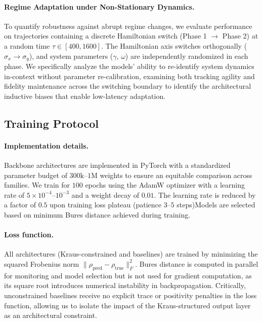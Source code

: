 \documentclass{article} %
\begin{document}
\paragraph{Regime Adaptation under Non-Stationary Dynamics.}
To quantify robustness against abrupt regime changes, we evaluate performance on trajectories containing a discrete Hamiltonian switch (Phase 1 $\to$ Phase 2) at a random time $\tau \in [400, 1600]$. The Hamiltonian axis switches orthogonally ($\sigma_x \to \sigma_y$), and system parameters ($\gamma$, $\omega$) are independently randomized in each phase. We specifically analyze the models' ability to re-identify system dynamics in-context without parameter re-calibration, examining both tracking agility and fidelity maintenance across the switching boundary to identify the architectural inductive biases that enable low-latency adaptation.
\subsection{Training Protocol}

\paragraph{Implementation details.}
Backbone architectures are implemented in PyTorch \cite{paszke2019pytorch}with a standardized parameter budget of $300\text{k}$--$1\text{M}$ weights to ensure an equitable comparison across families. We train for $100$ epochs using the AdamW optimizer with a learning rate of $5\times10^{-4}$--$10^{-3}$ and a weight decay of $0.01$. The learning rate is reduced by a factor of $0.5$ upon training loss plateau (patience $3$--$5$ steps)Models are selected based on minimum Bures distance achieved during training.

\paragraph{Loss function.}
All architectures (Kraus-constrained and baselines) are trained by minimizing the squared Frobenius norm $\|\rho_{\text{pred}} - \rho_{\text{true}}\|_F^2$. Bures distance is computed in parallel for monitoring and model selection but is not used for gradient computation, as its square root introduces numerical instability in backpropagation. Critically, unconstrained baselines receive no explicit trace or positivity penalties in the loss function, allowing us to isolate the impact of the Kraus-structured output layer as an architectural constraint.
\end{document}
